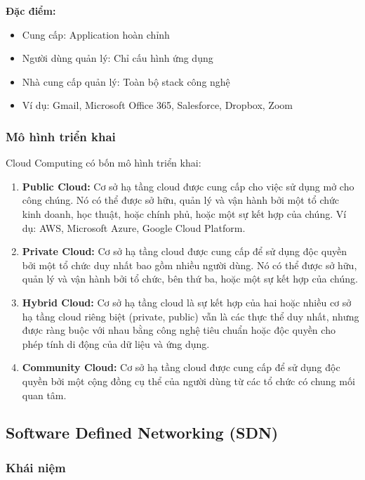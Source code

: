 \textbf{Đặc điểm:}
\begin{itemize}
    \item Cung cấp: Application hoàn chỉnh
    \item Người dùng quản lý: Chỉ cấu hình ứng dụng
    \item Nhà cung cấp quản lý: Toàn bộ stack công nghệ
    \item Ví dụ: Gmail, Microsoft Office 365, Salesforce, Dropbox, Zoom
\end{itemize}

\subsubsection{Mô hình triển khai}
Cloud Computing có bốn mô hình triển khai:

\begin{enumerate}
    \item \textbf{Public Cloud:} Cơ sở hạ tầng cloud được cung cấp cho việc sử dụng mở cho công chúng. Nó có thể được sở hữu, quản lý và vận hành bởi một tổ chức kinh doanh, học thuật, hoặc chính phủ, hoặc một sự kết hợp của chúng. Ví dụ: AWS, Microsoft Azure, Google Cloud Platform.
    
    \item \textbf{Private Cloud:} Cơ sở hạ tầng cloud được cung cấp để sử dụng độc quyền bởi một tổ chức duy nhất bao gồm nhiều người dùng. Nó có thể được sở hữu, quản lý và vận hành bởi tổ chức, bên thứ ba, hoặc một sự kết hợp của chúng.
    
    \item \textbf{Hybrid Cloud:} Cơ sở hạ tầng cloud là sự kết hợp của hai hoặc nhiều cơ sở hạ tầng cloud riêng biệt (private, public) vẫn là các thực thể duy nhất, nhưng được ràng buộc với nhau bằng công nghệ tiêu chuẩn hoặc độc quyền cho phép tính di động của dữ liệu và ứng dụng.
    
    \item \textbf{Community Cloud:} Cơ sở hạ tầng cloud được cung cấp để sử dụng độc quyền bởi một cộng đồng cụ thể của người dùng từ các tổ chức có chung mối quan tâm.
\end{enumerate}

\subsection{Software Defined Networking (SDN)}

\subsubsection{Khái niệm}

